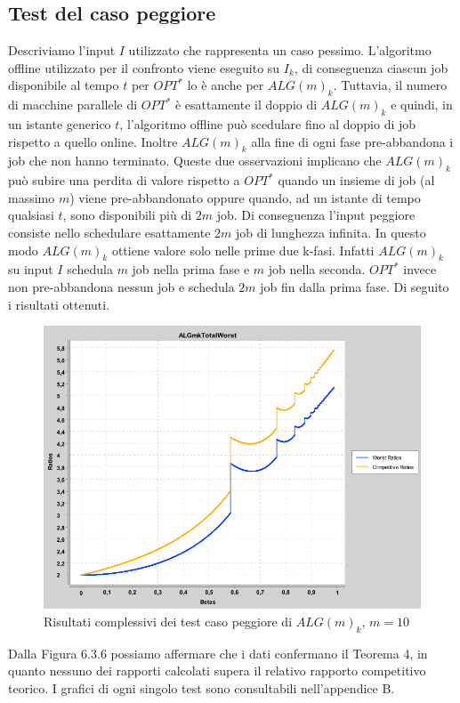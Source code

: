 \documentclass[twoside,openany,titlepage,fleqn,
	headinclude,12pt,a4paper,BCOR5mm,footinclude]{scrbook}
\begin{document}
\subsection{Test del caso peggiore}
Descriviamo l'input $I$ utilizzato che rappresenta un caso pessimo. L'algoritmo offline utilizzato per il confronto viene eseguito su $I_{k}$, di conseguenza ciascun job disponibile al tempo $t$ per $OPT^{*}$ lo è anche per $ALG(m)_{k}$. Tuttavia, il numero di macchine parallele di $OPT^{*}$ è esattamente il doppio di $ALG(m)_{k}$ e quindi, in un istante generico $t$, l'algoritmo offline può scedulare fino al doppio di job rispetto a quello online. Inoltre $ALG(m)_{k}$ alla fine di ogni fase pre-abbandona i job che non hanno terminato. Queste due osservazioni implicano che $ALG(m)_{k}$ può subire una perdita di valore rispetto a $OPT^{*}$ quando un insieme di job (al massimo $m$) viene pre-abbandonato oppure quando, ad un istante di tempo qualsiasi $t$, sono disponibili più di $2m$ job. Di conseguenza l'input peggiore consiste nello schedulare esattamente $2m$ job di lunghezza infinita. In questo modo $ALG(m)_{k}$ ottiene valore solo nelle prime due k-fasi. Infatti $ALG(m)_{k}$ su input $I$ schedula $m$ job nella prima fase e $m$ job nella seconda. $OPT^{*}$ invece non pre-abbandona nessun job e schedula $2m$ job fin dalla prima fase. 
Di seguito i risultati ottenuti.
\begin{figure}[H]
\caption[Unione test caso peggiore $ALG(m)_{K}$]{Risultati complessivi dei test caso peggiore di $ALG(m)_{k}$, $m = 10$}
\centering
\includegraphics[scale=0.4]{worst/ALGmkTotalWorst.png}
\end{figure}
Dalla Figura 6.3.6 possiamo affermare che i dati confermano il Teorema 4, in quanto nessuno dei rapporti calcolati supera il relativo rapporto competitivo teorico. I grafici di ogni singolo test sono consultabili nell'appendice B.
\appendix
\end{document}
